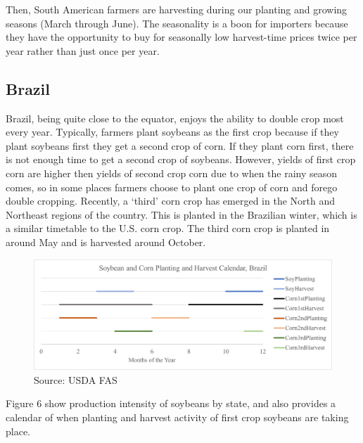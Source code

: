 \documentclass[
  letterpaper,
  DIV=11,
  numbers=noendperiod]{scrreprt}
\begin{document}
Then, South American farmers are harvesting during our planting and
growing seasons (March through June). The seasonality is a boon for
importers because they have the opportunity to buy for seasonally low
harvest-time prices twice per year rather than just once per year.

\hypertarget{brazil}{%
\subsection{Brazil}\label{brazil}}

Brazil, being quite close to the equator, enjoys the ability to double
crop most every year. Typically, farmers plant soybeans as the first
crop because if they plant soybeans first they get a second crop of
corn. If they plant corn first, there is not enough time to get a second
crop of soybeans. However, yields of first crop corn are higher then
yields of second crop corn due to when the rainy season comes, so in
some places farmers choose to plant one crop of corn and forego double
cropping. Recently, a `third' corn crop has emerged in the North and
Northeast regions of the country. This is planted in the Brazilian
winter, which is a similar timetable to the U.S. corn crop. The third
corn crop is planted in around May and is harvested around October.

\begin{figure}

{\centering \includegraphics{assets/Brazilcalendar.png}

}

\caption{Source: USDA FAS}

\end{figure}

Figure 6 show production intensity of soybeans by state, and also
provides a calendar of when planting and harvest activity of first crop
soybeans are taking place.
\end{document}
